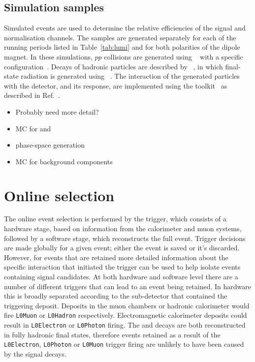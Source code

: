 \subsection{Simulation samples}
\label{sec:mc}

Simulated events are used to determine the relative efficiencies of the signal and normalisation channels. 
The samples are generated separately for each of the running periods listed in Table~\ref{tab:lumi} and for both polarities of the \lhcb dipole magnet. In these simulations, $pp$ collisions are generated using \pythia~\cite{Sjostrand:2007gs,Sjostrand:2006za} with a specific \lhcb configuration~\cite{LHCb-PROC-2010-056}.  Decays of hadronic particles are described by \evtgen~\cite{Lange:2001uf}, in which final-state radiation is generated using \photos~\cite{Golonka:2005pn}. The interaction of the generated particles with the detector, and its response, are implemented using the \geant toolkit~\cite{Allison:2006ve, *Agostinelli:2002hh} as described in Ref.~\cite{LHCb-PROC-2011-006}.

{\color{Red}
\begin{itemize}
\item Probably need more detail?
\item MC for \decay{\Bp}{\Dsp\phiz} and \decay{\Bp}{\Dsp\Kp\Km}
\item phase-space generation
\item MC for background components
\end{itemize}
}

\section{Online selection}

The online event selection is performed by the \lhcb trigger, which consists of a hardware stage, based on information from the calorimeter and muon
systems, followed by a software stage, which reconstructs the full event.
Trigger decisions are made globally for a given event; either the event is saved or it's discarded. However, for events that are retained more detailed information about the specific interaction that initiated the trigger can be used to help isolate events containing signal candidates. At both hardware and software level there are a number of different triggers that can lead to an event being retained. In hardware this is broadly separated according to the sub-detector that contained the triggering deposit. Deposits in the muon chambers or hadronic calorimeter would fire \texttt{L0Muon} or \texttt{L0Hadron} respectively. Electromagnetic calorimeter deposits could result in \texttt{L0Electron} or \texttt{L0Photon} firing. The \decay{\Bp}{\Dsp\Kp\Km} and \decay{\Bp}{\Dsp}{\phiz} decays are both reconstructed in fully hadronic final states, therefore events retained as a result of the \texttt{L0Electron}, \texttt{L0Photon} or \texttt{L0Muon} trigger firing are unlikely to have been caused by the signal decays. 

